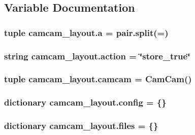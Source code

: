 \subsection{Variable Documentation}
\hypertarget{namespacecamcam__layout_a4693b9fdabb3c2c214239fcba102f1ce}{}
\subsubsection[{a}]{\setlength{\rightskip}{0pt plus 5cm}tuple camcam\+\_\+layout.\+a = pair.\+split(\textquotesingle{}=\textquotesingle{})}\label{namespacecamcam__layout_a4693b9fdabb3c2c214239fcba102f1ce}
\hypertarget{namespacecamcam__layout_a71172dacf7602866e7e96b4252a15441}{}
\subsubsection[{action}]{\setlength{\rightskip}{0pt plus 5cm}string camcam\+\_\+layout.\+action = \char`\"{}store\+\_\+true\char`\"{}}\label{namespacecamcam__layout_a71172dacf7602866e7e96b4252a15441}
\hypertarget{namespacecamcam__layout_ae87c88da350af649972459a28988ebb8}{}
\subsubsection[{camcam}]{\setlength{\rightskip}{0pt plus 5cm}tuple camcam\+\_\+layout.\+camcam = {\bf Cam\+Cam}()}\label{namespacecamcam__layout_ae87c88da350af649972459a28988ebb8}
\hypertarget{namespacecamcam__layout_a6cec7cab5f48675ec716f94c0a23836e}{}
\subsubsection[{config}]{\setlength{\rightskip}{0pt plus 5cm}dictionary camcam\+\_\+layout.\+config = \{\}}\label{namespacecamcam__layout_a6cec7cab5f48675ec716f94c0a23836e}
\hypertarget{namespacecamcam__layout_ac7f3bbb8118ef7b6eea636a1316c0817}{}
\subsubsection[{files}]{\setlength{\rightskip}{0pt plus 5cm}dictionary camcam\+\_\+layout.\+files = \{\}}\label{namespacecamcam__layout_ac7f3bbb8118ef7b6eea636a1316c0817}
\hypertarget{namespacecamcam__layout_a0af636005ce49aadd41c5bc3ff4e8bae}{}
